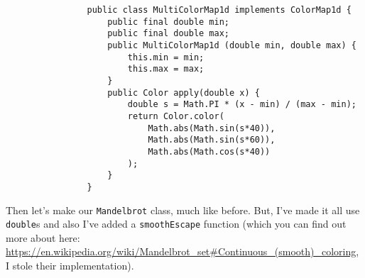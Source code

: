 \documentclass{article}
\begin{document}
            \begin{verbatim}            
                public class MultiColorMap1d implements ColorMap1d {
                    public final double min;
                    public final double max;
                    public MultiColorMap1d (double min, double max) {
                        this.min = min;
                        this.max = max;
                    }
                    public Color apply(double x) {
                        double s = Math.PI * (x - min) / (max - min);
                        return Color.color(
                            Math.abs(Math.sin(s*40)), 
                            Math.abs(Math.sin(s*60)), 
                            Math.abs(Math.cos(s*40))
                        );
                    }
                }
            \end{verbatim}
        
            \newpage
            Then let's make our \texttt{Mandelbrot} class, much like before. But, I've made it all use \texttt{double}s and also I've added
            a \texttt{smoothEscape} function (which you can find out more about here:
            \url{https://en.wikipedia.org/wiki/Mandelbrot_set#Continuous_(smooth)_coloring}, I stole their implementation).
            
\end{document}
